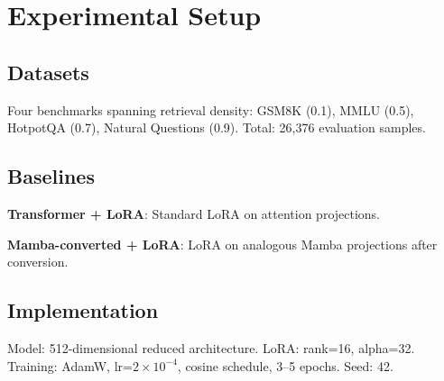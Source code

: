 \section{Experimental Setup}

\subsection{Datasets}

Four benchmarks spanning retrieval density: GSM8K (0.1), MMLU (0.5), HotpotQA (0.7), Natural Questions (0.9). Total: 26,376 evaluation samples.

\subsection{Baselines}

\textbf{Transformer + LoRA}: Standard LoRA on attention projections.

\textbf{Mamba-converted + LoRA}: LoRA on analogous Mamba projections after conversion.

\subsection{Implementation}

Model: 512-dimensional reduced architecture. LoRA: rank=16, alpha=32. Training: AdamW, lr=$2 \times 10^{-4}$, cosine schedule, 3--5 epochs. Seed: 42.
